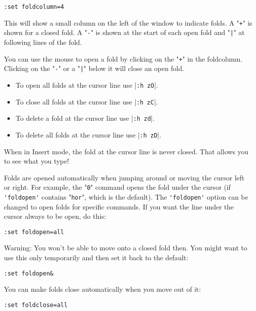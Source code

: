\begin{Verbatim}[samepage=true]
 :set foldcolumn=4
\end{Verbatim}

This will show a small column on the left of the window to indicate folds.
A "\verb!+!" is shown for a closed fold.
A "\verb!-!" is shown at the start of each open fold and "\verb!|!" at following lines of the fold.

You can use the mouse to open a fold by clicking on the "\verb!+!" in the foldcolumn.
Clicking on the "\verb!-!" or a "\verb!|!" below it will close an open fold.

\begin{itemize}
	\item To open all folds at the cursor line use |\verb!:h zO!|.
	\item To close all folds at the cursor line use |\verb!:h zC!|.
	\item To delete a fold at the cursor line use |\verb!:h zd!|.
	\item To delete all folds at the cursor line use |\verb!:h zD!|.
\end{itemize}


When in Insert mode, the fold at the cursor line is never closed.
That allows you to see what you type!

Folds are opened automatically when jumping around or moving the cursor left or right.
For example, the "\verb!0!" command opens the fold under the cursor (if \verb!'foldopen'! contains "\verb!hor!", which is the default).
The \verb!'foldopen'! option can be changed to open folds for specific commands.
If you want the line under the cursor always to be open, do this:

\begin{Verbatim}[samepage=true]
 :set foldopen=all
\end{Verbatim}

Warning: You won't be able to move onto a closed fold then.
You might want to use this only temporarily and then set it back to the default:

\begin{Verbatim}[samepage=true]
 :set foldopen&
\end{Verbatim}

You can make folds close automatically when you move out of it:

\begin{Verbatim}[samepage=true]
 :set foldclose=all
\end{Verbatim}

